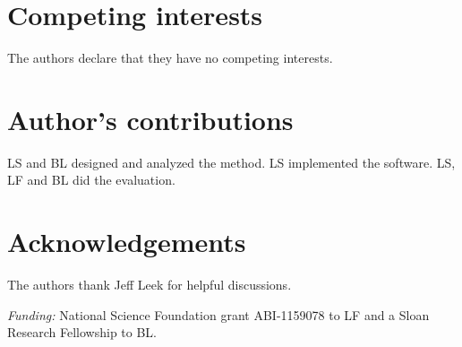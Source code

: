 \documentclass{bmcart}
\begin{document}
\begin{backmatter}

\section*{Competing interests}
  The authors declare that they have no competing interests.

\section*{Author's contributions}
  LS and BL designed and analyzed the method. LS implemented the software. LS, LF and BL did the evaluation.

\section*{Acknowledgements}
The authors thank Jeff Leek for helpful discussions.

\noindent\emph{Funding:} National Science Foundation grant ABI-1159078 to LF and a Sloan Research Fellowship to BL.





\end{backmatter}
\end{document}
